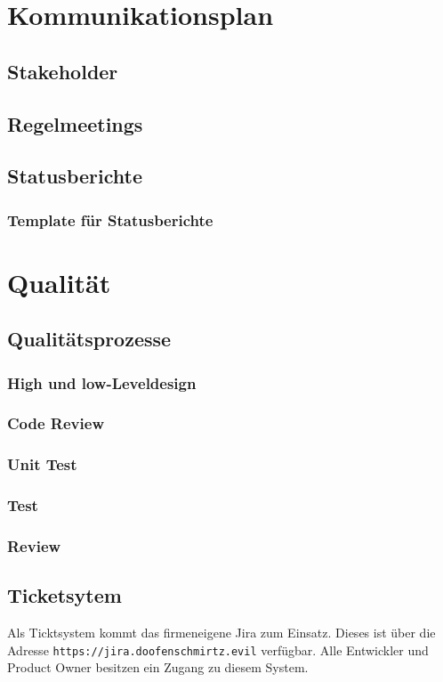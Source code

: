 \section{Kommunikationsplan}
\lipsum[2]
\subsection{Stakeholder}
\lipsum[2]
\subsection{Regelmeetings} %
\lipsum[2]
\subsection{Statusberichte} %
\lipsum[2]
\subsubsection{Template für Statusberichte}
\lipsum[2]
\section{Qualität}
\lipsum[2]
\subsection{Qualitätsprozesse} %
\lipsum[2]
\subsubsection{High und low-Leveldesign}
\lipsum[2]
\subsubsection{Code Review}
\lipsum[2]
\subsubsection{Unit Test}
\lipsum[2]
\subsubsection{Test}
\lipsum[2]
\subsubsection{Review}
\lipsum[2]
\subsection{Ticketsytem}
Als Ticktsystem kommt das firmeneigene Jira zum Einsatz. Dieses ist über die Adresse \texttt{https://jira.doofenschmirtz.evil} verfügbar. Alle Entwickler und Product Owner besitzen ein Zugang zu diesem System.
